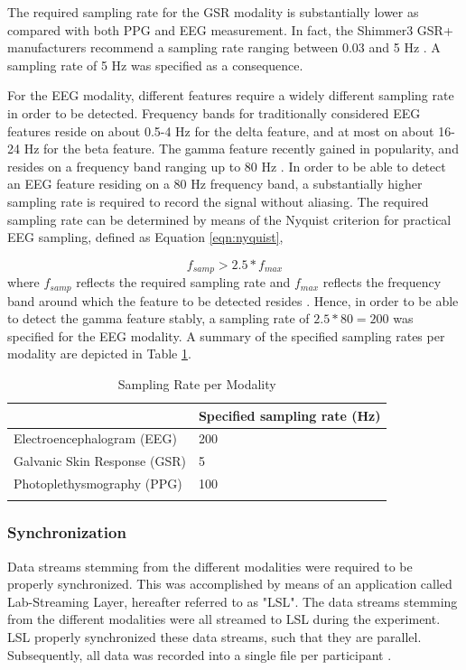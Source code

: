 \documentclass[12pt]{article}
\begin{document}
The required sampling rate for the GSR modality is substantially lower as compared with both PPG and EEG measurement. In fact, the Shimmer3 GSR+ manufacturers recommend a sampling rate ranging between 0.03 and 5 Hz \cite{shimmer}. A sampling rate of 5 Hz was specified as a consequence. 

For the EEG modality, different features require a widely different sampling rate in order to be detected. Frequency bands for traditionally considered EEG features reside on about 0.5-4 Hz for the delta feature, and at most on about 16-24 Hz for the beta feature. The gamma feature recently gained in popularity, and resides on a frequency band ranging up to 80 Hz \cite{weiergraeber2016sampling}. In order to be able to detect an EEG feature residing on a 80 Hz frequency band, a substantially higher sampling rate is required to record the signal without aliasing. The required sampling rate can be determined by means of the Nyquist criterion for practical EEG sampling, defined as Equation \ref{eqn:nyquist},

\begin{equation}
\label{eqn:nyquist}
f_{samp} > 2.5 * f_{max}
\end{equation}
where $f_{samp}$ reflects the required sampling rate and $f_{max}$ reflects the frequency band around which the feature to be detected resides \cite{srinivasan1998estimating}. Hence, in order to be able to detect the gamma feature stably, a sampling rate of $2.5*80=200$ was specified for the EEG modality. A summary of the specified sampling rates per modality are depicted in Table \ref{table:samplingrate}.

\bgroup
\def\arraystretch{1.6}%
\begin{table}[h]
\bigskip
\caption{Sampling Rate per Modality}
\label{table:samplingrate}
\begin{tabular}{ll}
    & Specified sampling rate (Hz) \\ \hline
 Electroencephalogram (EEG) & 200                         \\
Galvanic Skin Response (GSR) & 5                           \\
Photoplethysmography (PPG) & 100                         \\ \hline
   \bigskip
\end{tabular}
\end{table}
\egroup

\subsubsection{Synchronization}
Data streams stemming from the different modalities were required to be properly synchronized. This was accomplished by means of an application called Lab-Streaming Layer, hereafter referred to as "LSL". The data streams stemming from the different modalities were all streamed to LSL during the experiment. LSL properly synchronized these data streams, such that they are parallel. Subsequently, all data was recorded into a single file per participant \cite{kothe2018lab}.
\bigskip
\end{document}

